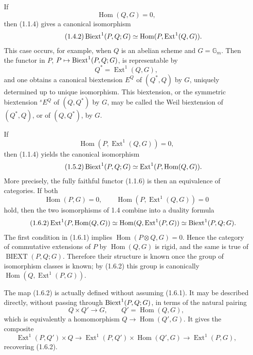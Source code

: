\documentclass[11pt]{article}
\providecommand{\Gm}{\mathbb G_m}
\providecommand{\Hom}{\operatorname{Hom}}
\providecommand{\Ext}{\operatorname{Ext}}
\begin{document}
If
\begin{equation}\tag{1.4.1}
        \Hom(Q,G)=0,
\end{equation}
then (1.1.4) gives a canonical isomorphism
\begin{equation}\tag{1.4.2}
        \Biext^1(P,Q;G)\simeq\Hom(P,\Ext^1(Q,G)).
\end{equation}
This case occurs, for example, when \(Q\) is an abelian scheme and \(G=\Gm\).  Then the functor in \(P\), \(P\mapsto\operatorname{Biext}^1(P,Q;G)\), is representable by
\[
        Q^*=\Ext^1(Q,G),
\]
and one obtains a canonical biextension \(E^Q\) of \((Q^*,Q)\) by \(G\), uniquely determined up to unique isomorphism.  This biextension, or the symmetric biextension \({}^sE^Q\) of \((Q,Q^*)\) by \(G\), may be called the Weil biextension of \((Q^*,Q)\), or of \((Q,Q^*)\), by \(G\).

If
\begin{equation}\tag{1.5.1}
        \Hom(P,\Ext^1(Q,G))=0,
\end{equation}
then (1.1.4) yields the canonical isomorphism
\begin{equation}\tag{1.5.2}
        \Biext^1(P,Q;G)\simeq \Ext^1(P,\Hom(Q,G)).
\end{equation}
More precisely, the fully faithful functor (1.1.6) is then an equivalence of categories.  If both
\begin{equation}\tag{1.6.1}
        \Hom(P,G)=0,
        \qquad
        \Hom(P,\Ext^1(Q,G))=0
\end{equation}
hold, then the two isomorphisms of 1.4 combine into a duality formula
\begin{equation}\tag{1.6.2}
        \Ext^1(P,\Hom(Q,G))
        \simeq \Hom(Q,\Ext^1(P,G))
        \simeq \Biext^1(P,Q;G).
\end{equation}
The first condition in (1.6.1) implies \(\Hom(P\otimes Q,G)=0\).  Hence the category of commutative extensions of \(P\) by \(\Hom(Q,G)\) is rigid, and the same is true of \(\operatorname{BIEXT}(P,Q;G)\).  Therefore their structure is known once the group of isomorphism classes is known; by (1.6.2) this group is canonically \(\Hom(Q,\Ext^1(P,G))\).

The map (1.6.2) is actually defined without assuming (1.6.1).  It may be described directly, without passing through \(\operatorname{Biext}^1(P,Q;G)\), in terms of the natural pairing
\[
        Q\times Q'\longrightarrow G,
        \qquad Q'=\Hom(Q,G),
\]
which is equivalently a homomorphism \(Q\to\Hom(Q',G)\).  It gives the composite
\begin{equation}\tag{1.6.3}
        \Ext^1(P,Q')\times Q
        \longrightarrow \Ext^1(P,Q')\times\Hom(Q',G)
        \longrightarrow \Ext^1(P,G),
\end{equation}
recovering (1.6.2).
\end{document}
